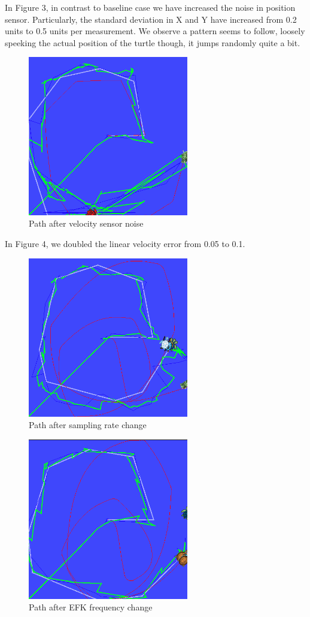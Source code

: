 \documentclass[10pt,a4paper,twocolumn]{article}
\begin{document}
In Figure 3, in contrast to baseline case we have increased the noise in position sensor. Particularly, the standard deviation in X and Y have increased from 0.2 units to 0.5 units per measurement. We observe a pattern seems to follow, loosely speeking the actual position of the turtle though, it jumps randomly quite a bit.

\begin{figure}[ht!]
	\centering
	\includegraphics[width=70mm]{velocity_sensor_noise}
	\caption{Path after velocity sensor noise \label{overflow}}
\end{figure}

In Figure 4, we doubled the linear velocity error from 0.05 to 0.1.

\begin{figure}[ht!]
	\centering
	\includegraphics[width=70mm]{sampling_rate}
	\caption{Path after sampling rate change \label{overflow}}
\end{figure}

\begin{figure}[ht!]
	\centering
	\includegraphics[width=70mm]{ekf_frequency}
	\caption{Path after EFK frequency change \label{overflow}}
\end{figure}
\end{document}
